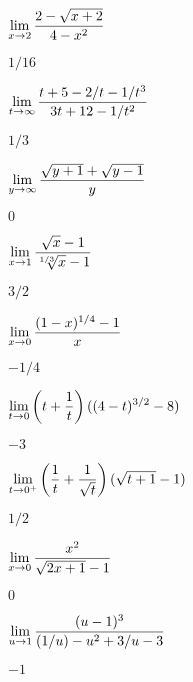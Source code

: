 \begin{exercises}
\begin{exercise} $\displaystyle\lim_{x\to2}{2-\sqrt{x+2}\over 4-x^2}$
\begin{answer} $1/16$
\end{answer}\end{exercise}

\begin{exercise} $\displaystyle\lim_{t\to\infty}{t+5-2/t-1/t^3\over 3t+12-1/t^2}$
\begin{answer} $1/3$
\end{answer}\end{exercise}

\begin{exercise} $\displaystyle\lim_{y\to\infty}{\sqrt{y+1}+\sqrt{y-1}\over y}$
\begin{answer} $0$
\end{answer}\end{exercise}

\begin{exercise} $\ds\lim_{x\to1}{\sqrt{x}-1\over \root 1/3\of{x}-1}$
\begin{answer} $3/2$
\end{answer}\end{exercise}

\begin{exercise} $\displaystyle\lim_{x\to0}{(1-x)^{1/4}-1\over x}$
\begin{answer} $-1/4$
\end{answer}\end{exercise}

\begin{exercise} $\displaystyle\lim_{t\to 0}{\left(t+{1\over t}\right)((4-t)^{3/2}-8)}$
\begin{answer} $-3$
\end{answer}\end{exercise}

\begin{exercise} $\displaystyle\lim_{t\to 0^+}\left({1\over t}+{1\over\sqrt{t}}\right)
(\sqrt{t+1}-1)$
\begin{answer} $1/2$
\end{answer}\end{exercise}

\begin{exercise} $\displaystyle\lim_{x\to 0}{x^2\over\sqrt{2x+1}-1}$
\begin{answer} $0$
\end{answer}\end{exercise}

\begin{exercise} $\displaystyle\lim_{u\to 1}{(u-1)^3\over (1/u)-u^2+3/u-3}$
\begin{answer} $-1$
\end{answer}\end{exercise}


\end{exercises}
